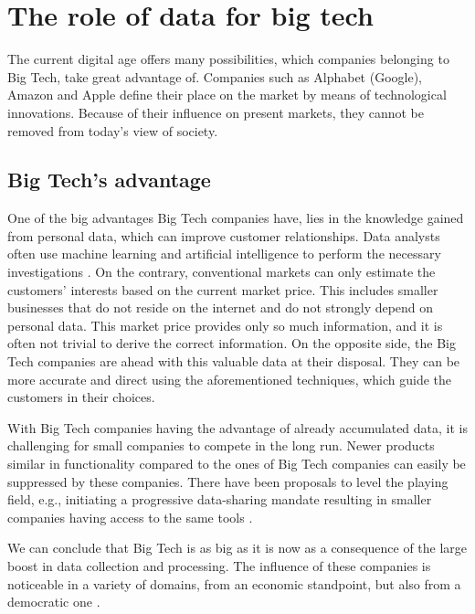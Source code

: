 \section{The role of data for big tech}

The current digital age offers many possibilities, which companies belonging to Big Tech, take great advantage of. 
Companies such as Alphabet (Google), Amazon and Apple define their place on the market by means of technological innovations.
Because of their influence on present markets, they cannot be removed from today's view of society.

\subsection{Big Tech's advantage}
\label{s:big tech}

One of the big advantages Big Tech companies have, lies in the knowledge gained from personal data, which can improve customer relationships.
Data analysts often use machine learning and artificial intelligence to perform the necessary investigations \cite{Creser2021}.
On the contrary, conventional markets can only estimate the customers' interests based on the current market price. 
This includes smaller businesses that do not reside on the internet and do not strongly depend on personal data.
This market price provides only so much information, and it is often not trivial to derive the correct information. 
On the opposite side, the Big Tech companies are ahead with this valuable data at their disposal. 
They can be more accurate and direct using the aforementioned techniques, which guide the customers in their choices.

With Big Tech companies having the advantage of already accumulated data, it is challenging for small companies to compete in the long run.
Newer products similar in functionality compared to the ones of Big Tech companies can easily be suppressed by these companies.
There have been proposals to level the playing field, e.g., initiating a progressive data-sharing mandate resulting in smaller companies having access to the same tools \cite{Viktor2018}.

We can conclude that Big Tech is as big as it is now as a consequence of the large boost in data collection and processing. 
The influence of these companies is noticeable in a variety of domains, from an economic standpoint, but also from a democratic one \cite{Fukuyama2021, Ghosh2021}.
